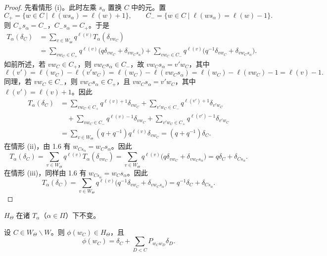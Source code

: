 \begin{proof}
先看情形 (i)。此时左乘 $s_\alpha$ 置换 $C$ 中的元。置
$$C_+=\{w\in C\mid\ell(ws_\alpha)=\ell(w)+1\},\qquad
C_-=\{w\in C\mid\ell(ws_\alpha)=\ell(w)-1\}.$$
则 $C_+s_\alpha=C_-$，$C_-s_\alpha=C_+$。于是
{\small
\begin{align*}
T_\alpha(\delta_C)&=\sum_{v\in W_\Theta}q^{\ell(v)}T_\alpha(\delta_{vw_C})\\
&=\sum_{vw_C\in C_+}q^{\ell(v)}\bigl(q\delta_{vw_C}+\delta_{vw_Cs_\alpha}\bigr)
+\sum_{vw_C\in C_-}q^{\ell(v)}\bigl(q^{-1}\delta_{vw_C}+\delta_{vw_Cs_\alpha}\bigr).
\end{align*}
}
如前所述，若 $vw_C\in C_+$，则 $vw_Cs_\alpha\in C_-$，故 $vw_Cs_\alpha=v'w_C$，其中
$$\ell(v')=\ell(w_C)-\ell(v'w_C)=\ell(w_C)-\ell(vw_Cs_\alpha)=\ell(w_C)-\ell(vw_C)-1=\ell(v)-1.$$
同理，若 $vw_C\in C_-$，则 $vw_Cs_\alpha\in C_+$，且 $vw_Cs_\alpha=v'w_C$，其中 $\ell(v')=\ell(v)+1$。因此
{\small
\begin{align*}
T_\alpha(\delta_C)&=\sum_{vw_C\in C_+}q^{\ell(v)+1}\delta_{vw_C}
+\sum_{v'w_C\in C_-}q^{\ell(v')+1}\delta_{v'w_C}\\
&\quad+\sum_{vw_C\in C_-}q^{\ell(v)-1}\delta_{vw_C}
+\sum_{v'w_C\in C_+}q^{\ell(v')-1}\delta_{v'w_C}\\
&=\sum_{v\in W_\Theta}(q+q^{-1})q^{\ell(v)}\delta_{vw_C}=(q+q^{-1})\delta_C.
\end{align*}
}
在情形 (ii)，由 1.6 有 $w_{Cs_\alpha}=w_Cs_\alpha$。因此
{\small
$$T_\alpha(\delta_C)=\sum_{v\in W_\Theta}q^{\ell(v)}T_\alpha(\delta_{vw_C})
=\sum_{v\in W_\Theta}q^{\ell(v)}\bigl(q\delta_{vw_C}+\delta_{vw_Cs_\alpha}\bigr)
=q\delta_C+\delta_{Cs_\alpha}.$$}
在情形 (iii)，同样由 1.6 有 $w_{Cs_\alpha}=w_Cs_\alpha$。因此
{\small
$$T_\alpha(\delta_C)=\sum_{v\in W_\Theta}q^{\ell(v)}\bigl(q^{-1}\delta_{vw_C}+\delta_{vw_Cs_\alpha}\bigr)
=q^{-1}\delta_C+\delta_{Cs_\alpha}.$$}
\end{proof}

\begin{corollary}\label{cor:06.3.2}
$H_\Theta$ 在诸 $T_\alpha$（$\alpha\in\Pi$）下不变。
\end{corollary}

\begin{lemma}\label{lem:06.3.3}
设 $C\in W_\Theta\backslash W$。则 $\phi(w_C)\in H_\Theta$，且
$$\phi(w_C)=\delta_C+\sum_{D<C}P_{w_Cw_D}\delta_D.$$
\end{lemma}

